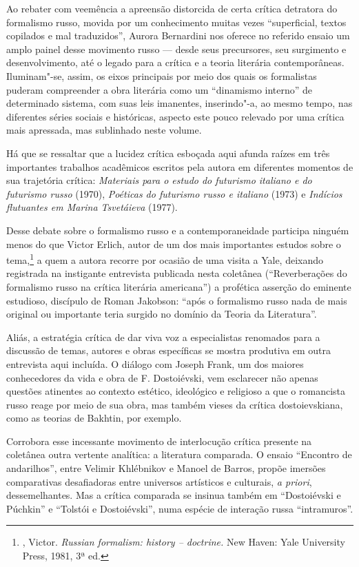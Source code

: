 Ao rebater com veemência a apreensão distorcida de certa crítica
detratora do formalismo russo, movida por um
conhecimento muitas vezes ``superficial, textos copilados e mal
traduzidos'', Aurora Bernardini nos oferece no referido ensaio um amplo painel desse movimento
russo --- desde seus precursores, seu surgimento e desenvolvimento, até o
legado para a crítica e a teoria literária contemporâneas. Iluminam"-se,
assim, os eixos principais por meio dos quais os formalistas
puderam compreender a obra literária como um ``dinamismo interno'' de
determinado sistema, com suas leis imanentes, inserindo"-a, ao mesmo
tempo, nas diferentes séries sociais e históricas, aspecto este pouco
relevado por uma crítica mais apressada, mas sublinhado neste volume.

Há que se ressaltar que a lucidez crítica esboçada aqui
afunda raízes em três importantes trabalhos acadêmicos
escritos pela autora em diferentes momentos de sua trajetória crítica:
\emph{Materiais para o estudo do futurismo italiano e do futurismo russo}
(1970), \emph{Poéticas do futurismo russo e italiano} (1973) e
\emph{Indícios flutuantes em Marina Tsvetáieva} (1977).

Desse debate sobre o formalismo russo e a
contemporaneidade participa ninguém menos do que Victor Erlich, autor de
um dos mais importantes estudos sobre o tema,\footnote{\scalebox{0.8}{ERLICH}, Victor. \emph{Russian
 formalism: history -- doctrine.} New Haven: Yale University Press,
 1981, 3ª ed.} a quem a autora recorre por ocasião de uma visita
a Yale, deixando registrada na instigante entrevista publicada nesta
coletânea (``Reverberações do formalismo russo na crítica literária 
americana'') a profética asserção do eminente estudioso, discípulo de Roman
Jakobson: ``após o formalismo russo nada de mais original ou importante
teria surgido no domínio da Teoria da Literatura''.

Aliás, a estratégia crítica de dar viva voz a especialistas renomados
para a discussão de temas, autores e obras específicas se mostra
produtiva em outra entrevista aqui incluída. O diálogo com Joseph Frank,
um dos maiores conhecedores da vida e obra de F. Dostoiévski, vem
esclarecer não apenas questões atinentes ao contexto estético,
ideológico e religioso a que o romancista russo reage por meio de sua
obra, mas também vieses da crítica dostoievskiana, como as teorias de
Bakhtin, por exemplo.

Corrobora esse incessante movimento de interlocução crítica presente na
coletânea outra vertente analítica: a literatura comparada. O
ensaio ``Encontro de andarilhos'', entre Velimir Khlébnikov e Manoel
de Barros, propõe imersões comparativas desafiadoras entre universos
artísticos e culturais, \emph{a priori}, dessemelhantes. Mas a crítica
comparada se insinua também em ``Dostoiévski e Púchkin'' e ``Tolstói e
Dostoiévski'', numa espécie de interação russa
``intramuros''.

